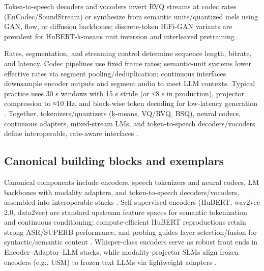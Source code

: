 \documentclass{article}
\begin{document}
Token-to-speech decoders and vocoders invert RVQ streams at codec rates (EnCodec/SoundStream) or synthesize from semantic units/quantized mels using GAN, flow, or diffusion backbones; discrete-token HiFi-GAN variants are prevalent for HuBERT-k-means unit inversion and interleaved pretraining \cite{wang2025tadicodectextawarediffusionspeechtokeniz,zeng2024scalingspeechtextpretrainingsyntheticint}.

Rates, segmentation, and streaming control determine sequence length, bitrate, and latency. Codec pipelines use fixed frame rates; semantic-unit systems lower effective rates via segment pooling/deduplication; continuous interfaces downsample encoder outputs and segment audio to meet LLM contexts. Typical practice uses 30 s windows with 15 s stride (or ≤8 s in production), projector compression to ≈10 Hz, and block-wise token decoding for low-latency generation \cite{nguyen2025qwenvsgemmaintegrationwhispercomparative,li2025seewossubmissionmlcslmlessonslearnedspee,zeng2024scalingspeechtextpretrainingsyntheticint}. Together, tokenizers/quantizers (k-means, VQ/RVQ, BSQ), neural codecs, continuous adapters, mixed-stream LMs, and token-to-speech decoders/vocoders define interoperable, rate-aware interfaces \cite{guo2025recentadvancesdiscretespeechtokensreview}.

\subsection{Canonical building blocks and exemplars} \label{subsec:Canonical building blocks and exemplars}
Canonical components include encoders, speech tokenizers and neural codecs, LM backbones with modality adapters, and token-to-speech decoders/vocoders, assembled into interoperable stacks \cite{guo2025recentadvancesdiscretespeechtokensreview}. Self-supervised encoders (HuBERT, wav2vec 2.0, data2vec) are standard upstream feature spaces for semantic tokenization and continuous conditioning; compute-efficient HuBERT reproductions retain strong ASR/SUPERB performance, and probing guides layer selection/fusion for syntactic/semantic content \cite{chen2023reducingbarriersselfsupervisedlearninghu,shen2023wavesyntaxprobingspokenlanguagemodels}. Whisper-class encoders serve as robust front ends in Encoder–Adaptor–LLM stacks, while modality-projector SLMs align frozen encoders (e.g., USM) to frozen text LLMs via lightweight adapters \cite{wang2023slmbridgethingapbetweenspeechtextfoundat,nguyen2025qwenvsgemmaintegrationwhispercomparative,guo2025recentadvancesdiscretespeechtokensreview}.
\end{document}
